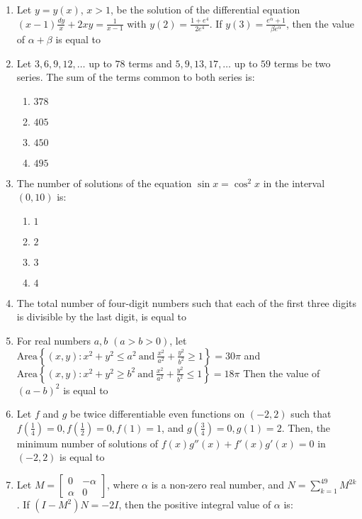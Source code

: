 \documentclass[journal,12pt,onecolumn]{IEEEtran}
\theoremstyle{remark}
\begin{document}
\begin{enumerate}
\begin{enumerate}
\end{enumerate}
\item Let $y = y(x)$, $x > 1$, be the solution of the differential equation 
$(x - 1) \frac{dy}{x} + 2xy = \frac{1}{x - 1}$ with $y(2) = \frac{1 + e^4}{2e^4}$.
If $y(3) = \frac{e^\alpha + 1}{\beta e^\alpha}$, then the value of $\alpha + \beta$ is equal to
\item Let $3, 6, 9, 12, \dots$ up to $78$ terms and $5, 9, 13, 17, \dots$ up to $59$ terms be two series. The sum of the terms common to both series is:
\begin{enumerate}
    \item $378$
    \item $405$
    \item $450$
    \item $495$
\end{enumerate}
\item The number of solutions of the equation $\sin x = \cos^2 x$ in the interval $(0, 10)$ is:
\begin{enumerate}
    \item $1$
    \item $2$
    \item $3$
    \item $4$
\end{enumerate}
\item The total number of four-digit numbers such that each of the first three digits is divisible by the last digit, is equal to 
\item For real numbers \( a, b \) \(( a > b > 0 )\), let 
\(
\text{Area}\left\{ (x, y) : x^2 + y^2 \leq a^2 \ \text{and} \ \frac{x^2}{a^2} + \frac{y^2}{b^2} \geq 1 \right\} = 30\pi 
\)
and 
\(
\text{Area}\left\{ (x, y) : x^2 + y^2 \geq b^2 \ \text{and} \ \frac{x^2}{a^2} + \frac{y^2}{b^2} \leq 1 \right\} = 18\pi 
\)
Then the value of \( (a - b)^2 \) is equal to
\item Let $f$ and $g$ be twice differentiable even functions on $(-2,2)$ such that $f\left(\frac{1}{4}\right) = 0, f\left(\frac{1}{2}\right) = 0, f(1) = 1$, and $g\left(\frac{3}{4}\right) = 0, g(1) = 2$. Then, the minimum number of solutions of $f(x) g''(x) + f'(x) g'(x) = 0$ in $(-2,2)$ is equal to
\item Let $M = \begin{bmatrix} 0 & -\alpha \\ \alpha & 0 \end{bmatrix}$, where $\alpha$ is a non-zero real number, and $N = \sum_{k=1}^{49} M^{2k}$. If $(I - M^2)N = -2I$, then the positive integral value of $\alpha$ is:

\end{enumerate}
\end{document}
